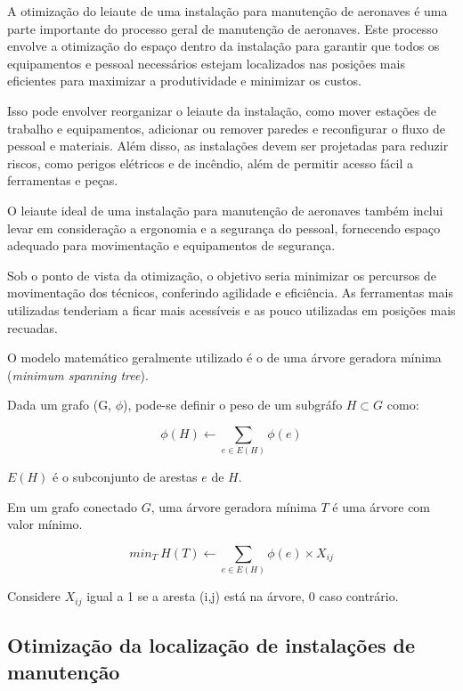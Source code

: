 \documentclass{article}
\begin{document}
A otimização do leiaute de uma instalação para manutenção de aeronaves é uma parte importante do processo geral de manutenção de aeronaves. Este processo envolve a otimização do espaço dentro da instalação para garantir que todos os equipamentos e pessoal necessários estejam localizados nas posições mais eficientes para maximizar a produtividade e minimizar os custos.

Isso pode envolver reorganizar o leiaute da instalação, como mover estações de trabalho e equipamentos, adicionar ou remover paredes e reconfigurar o fluxo de pessoal e materiais. Além disso, as instalações devem ser projetadas para reduzir riscos, como perigos elétricos e de incêndio, além de permitir acesso fácil a ferramentas e peças.

O leiaute ideal de uma instalação para manutenção de aeronaves também inclui levar em consideração a ergonomia e a segurança do pessoal, fornecendo espaço adequado para movimentação e equipamentos de segurança.

Sob o ponto de vista da otimização, o objetivo seria minimizar os percursos de movimentação dos técnicos, conferindo agilidade e eficiência. As ferramentas mais utilizadas tenderiam a ficar mais acessíveis e as pouco utilizadas em posições mais recuadas.

O modelo matemático geralmente utilizado é o de uma árvore geradora mínima ({\it minimum spanning tree}).

Dada um grafo (G, $\phi$), pode-se definir o peso de um subgráfo $H \subset G$ como:

\begin{equation} \label{eq:fo1}
\phi(H) \gets \sum_{e \in E(H)} \phi (e)
\end{equation}

$E(H)$ é o subconjunto de arestas $e$ de $H$.

Em um grafo conectado $G$, uma árvore geradora mínima $T$ é uma árvore com valor mínimo.

\begin{equation} \label{eq:fo2}
min_T\ H(T) \gets \sum_{e \in E(H)} \phi (e) \times X_{ij}
\end{equation}


Considere $X_{ij}$ igual a 1 se a aresta (i,j) está na árvore, 0 caso contrário.


\subsection{Otimização da localização de instalações de manutenção}
\end{document}
